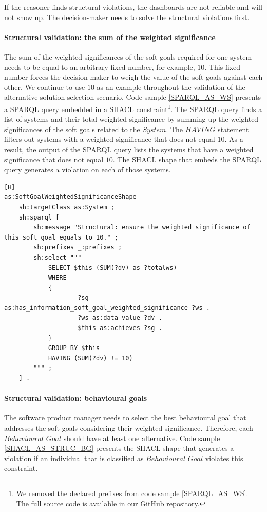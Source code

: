 If the reasoner finds structural violations, the dashboards are not reliable and will not show up. The decision-maker needs to solve the structural violations first.

\paragraph{Structural validation: the sum of the weighted significance}
The sum of the weighted significances of the soft goals required for one system needs to be equal to an arbitrary fixed number, for example, $10$. This fixed number forces the decision-maker to weigh the value of the soft goals against each other. We continue to use $10$ as an example throughout the validation of the alternative solution selection scenario. Code sample \ref{SPARQL_AS_WS} presents a SPARQL query embedded in a SHACL constraint\footnote{We removed the declared prefixes from code sample \ref{SPARQL_AS_WS}. The full source code is available in our GitHub repository.}. The SPARQL query finds a list of systems and their total weighted significance by summing up the weighted significances of the soft goals related to the $System$. The $HAVING$ statement filters out systems with a weighted significance that does not equal $10$. As a result, the output of the SPARQL query lists the systems that have a weighted significance that does not equal $10$. The SHACL shape that embeds the SPARQL query generates a violation on each of those systems.

\begin{lstlisting}[float,language=SHACLSPARQL,caption={A SPARQL query embedded in a SHACL shape. The SHACL shape generates violations depending on the outcome of the SPARQL query.},label={SPARQL_AS_WS}][H]
as:SoftGoalWeightedSignificanceShape
	sh:targetClass as:System ;
	sh:sparql [
		sh:message "Structural: ensure the weighted significance of this soft_goal equals to 10." ;
		sh:prefixes _:prefixes ;
		sh:select """
			SELECT $this (SUM(?dv) as ?totalws)
			WHERE
			{
					?sg as:has_information_soft_goal_weighted_significance ?ws .
					?ws as:data_value ?dv .
					$this as:achieves ?sg .
			}
			GROUP BY $this 
			HAVING (SUM(?dv) != 10)
		""" ;
	] .
\end{lstlisting}

\paragraph{Structural validation: behavioural goals}
The software product manager needs to select the best behavioural goal that addresses the soft goals considering their weighted significance. Therefore, each $Behavioural\_Goal$ should have at least one alternative. Code sample \ref{SHACL_AS_STRUC_BG} presents the SHACL shape that generates a violation if an individual that is classified as $Behavioural\_Goal$ violates this constraint.

